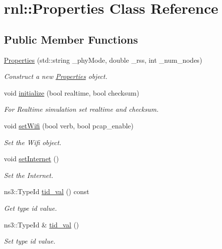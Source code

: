 \hypertarget{classrnl_1_1Properties}{}\section{rnl\+:\+:Properties Class Reference}
\label{classrnl_1_1Properties}
\subsection*{Public Member Functions}
\begin{DoxyCompactItemize}
\item 
\hyperlink{classrnl_1_1Properties_a8d5bb9a2f865134ce365d2145b15b617}{Properties} (std\+::string \+\_\+phy\+Mode, double \+\_\+rss, int \+\_\+num\+\_\+nodes)
\begin{DoxyCompactList}\small\item\em Construct a new \hyperlink{classrnl_1_1Properties}{Properties} object. \end{DoxyCompactList}\item 
void \hyperlink{classrnl_1_1Properties_aa6d0d94382d776c5752648c3429a03b1}{initialize} (bool realtime, bool checksum)
\begin{DoxyCompactList}\small\item\em For Realtime simulation set realtime and checksum. \end{DoxyCompactList}\item 
void \hyperlink{classrnl_1_1Properties_a7d9a1bba88439c985d9ea336b73f4b03}{set\+Wifi} (bool verb, bool pcap\+\_\+enable)
\begin{DoxyCompactList}\small\item\em Set the Wifi object. \end{DoxyCompactList}\item 
\mbox{\label{classrnl_1_1Properties_a8152430f378c949b321c9e541ff0aad8}} 
void \hyperlink{classrnl_1_1Properties_a8152430f378c949b321c9e541ff0aad8}{set\+Internet} ()
\begin{DoxyCompactList}\small\item\em Set the Internet. \end{DoxyCompactList}\item 
ns3\+::\+Type\+Id \hyperlink{classrnl_1_1Properties_ae2a22e3a35a82d24e02e6d653bcdb330}{tid\+\_\+val} () const
\begin{DoxyCompactList}\small\item\em Get type id value. \end{DoxyCompactList}\item 
ns3\+::\+Type\+Id \& \hyperlink{classrnl_1_1Properties_a2b715725840eadd5d40046a78a559803}{tid\+\_\+val} ()
\begin{DoxyCompactList}\small\item\em Set type id value. \end{DoxyCompactList}\end{DoxyCompactItemize}

